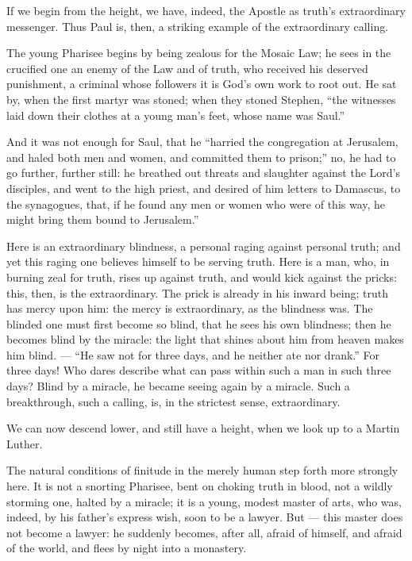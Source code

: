 \documentclass[12pt,a4paper]{book}
\begin{document}
If we begin from the height, we have, indeed, the Apostle as truth's extraordinary messenger. Thus Paul is, then, a striking example of the extraordinary calling.

The young Pharisee begins by being zealous for the Mosaic Law; he sees in the crucified one an enemy of the Law and of truth, who received his deserved punishment, a criminal whose followers it is God's own work to root out. He sat by, when the first martyr was stoned; when they stoned Stephen, ``the witnesses laid down their clothes at a young man's feet, whose name was Saul.''

And it was not enough for Saul, that he ``harried the congregation at Jerusalem, and haled both men and women, and committed them to prison;'' no, he had to go further, further still: he breathed out threats and slaughter against the Lord's disciples, and went to the high priest, and desired of him letters to Damascus, to the synagogues, that, if he found any men or women who were of this way, he might bring them bound to Jerusalem.''

Here is an extraordinary blindness, a personal raging against personal truth; and yet this raging one believes himself to be serving truth. Here is a man, who, in burning zeal for truth, rises up against truth, and would kick against the pricks: this, then, is the extraordinary. The prick is already in his inward being; truth has mercy upon him: the mercy is extraordinary, as the blindness was.
The blinded one must first become so blind, that he sees his own blindness; then he becomes blind by the miracle: the light that shines about him from heaven makes him blind. --- ``He saw not for three days, and he neither ate nor drank.'' For three days! Who dares describe what can pass within such a man in such three days? Blind by a miracle, he became seeing again by a miracle. Such a breakthrough, such a calling, is, in the strictest sense, extraordinary.

We can now descend lower, and still have a height, when we look up to a Martin Luther.

The natural conditions of finitude in the merely human step forth more strongly here. It is not a snorting Pharisee, bent on choking truth in blood, not a wildly storming one, halted by a miracle; it is a young, modest master of arts, who was, indeed, by his father's express wish, soon to be a lawyer. But --- this master does not become a lawyer: he suddenly becomes, after all, afraid of himself, and afraid of the world, and flees by night into a monastery.
\end{document}
